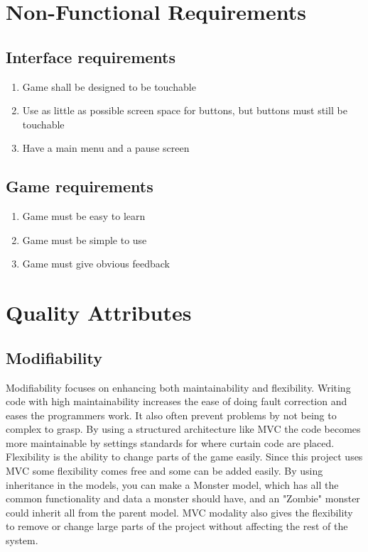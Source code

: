 	\section{Non-Functional Requirements}
		\subsection{Interface requirements}
		\begin{enumerate}
			\item Game shall be designed to be touchable
			\item Use as little as possible screen space for buttons, but buttons must still be touchable
			\item Have a main menu and a pause screen
		\end{enumerate}

		\subsection{Game requirements}
		\begin{enumerate}
			\item Game must be easy to learn
			\item Game must be simple to use
			\item Game must give obvious feedback
		\end{enumerate}

	\section{Quality Attributes}
		\subsection{Modifiability}
			Modifiability focuses on enhancing both maintainability and flexibility. Writing code with high maintainability increases the ease of doing fault correction and eases the programmers work. It also often prevent problems by not being to complex to grasp.
			By using a structured architecture like MVC the code becomes more maintainable by settings standards for where curtain code are placed.
			Flexibility is the ability to change parts of the game easily. Since this project uses MVC some flexibility comes free and some can be added easily.
			By using inheritance in the models, you can make a Monster model, which has all the common functionality and data a monster should have, and an "Zombie" monster could inherit all from the parent model.
			MVC modality also gives the flexibility to remove or change large parts of the project without affecting the rest of the system.

